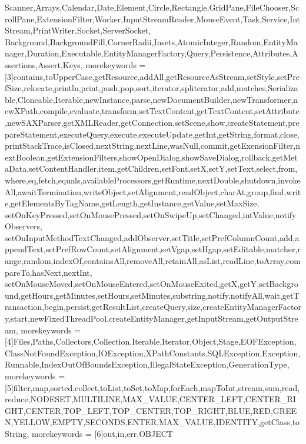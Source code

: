 {{Scanner,Arrays,Calendar,Date,Element,Circle,Rectangle,GridPane,FileChooser,ScrollPane,ExtensionFilter,Worker,InputStreamReader,MouseEvent,Task,Service,IntStream,PrintWriter,Socket,ServerSocket,%
Background,BackgroundFill,CornerRadii,Insets,AtomicInteger,Random,EntityManager,Duration,Executable,EntityManagerFactory,Query,Persistence,Attributes,Assertions,Assert,Keys},
morekeywords = [3]{contains,toUpperCase,getResource,addAll,getResourceAsStream,setStyle,setPrefSize,relocate,println,print,push,pop,sort,iterator,spliterator,add,matches,Serializable,Cloneable,Iterable,newInstance,parse,newDocumentBuilder,newTransformer,newXPath,compile,evaluate,transform,setTextContent,getTextContent,setAttribute,newSAXParser,getXMLReader,getConnection,setScene,show,createStatement,prepareStatement,executeQuery,execute,executeUpdate,getInt,getString,format,close,printStackTrace,isClosed,nextString,nextLine,wasNull,commit,getExensionFilter,nextBoolean,getExtensionFilters,showOpenDialog,showSaveDialog,rollback,getMetaData,setContentHandler,item,getChildren,setFont,setX,setY,setText,select,from,where,eq,fetch,equals,availableProcessors,getRuntime,nextDouble,shutdown,invokeAll,awaitTermination,writeObject,setAlignment,readObject,charAt,group,find,write,getElementsByTagName,getLength,getInstance,getValue,setMaxSize,%
setOnKeyPressed,setOnMousePressed,setOnSwipeUp,setChanged,intValue,notifyObservers, setOnInputMethodTextChanged,addObserver,setTitle,setPrefColumnCount,add,appendText,setPrefRowCount,setAlignment,setVgap,setHgap,setEditable,matcher,range,random,indexOf,containsAll,removeAll,retainAll,asList,readLine,toArray,compareTo,hasNext,nextInt,%
setOnMouseMoved,setOnMouseEntered,setOnMouseExited,getX,getY,setBackground,getHours,getMinutes,setHours,setMinutes,substring,notify,notifyAll,wait,getTransaction,begin,persist,getResultList,createQuery,size,createEntityManagerFactory,start,newFixedThreadPool,createEntityManager,getInputStream,getOutputStream},
morekeywords = [4]{Files,Paths,Collectors,Collection,Iterable,Iterator,Object,Stage,EOFException,ClassNotFoundException,IOException,XPathConstants,SQLException,Exception,Runnable,IndexOutOfBoundsException,IllegalStateException,GenerationType},
morekeywords = [5]{filter,map,sorted,collect,toList,toSet,toMap,forEach,mapToInt,stream,sum,read,reduce,NODESET,MULTILINE,MAX_VALUE,CENTER_LEFT,CENTER_RIGHT,CENTER,TOP_LEFT,TOP_CENTER,TOP_RIGHT,BLUE,RED,GREEN,YELLOW,EMPTY,SECONDS,ENTER,MAX_VALUE,IDENTITY,getClass,toString},
morekeywords = [6]{out,in,err,OBJECT}}
